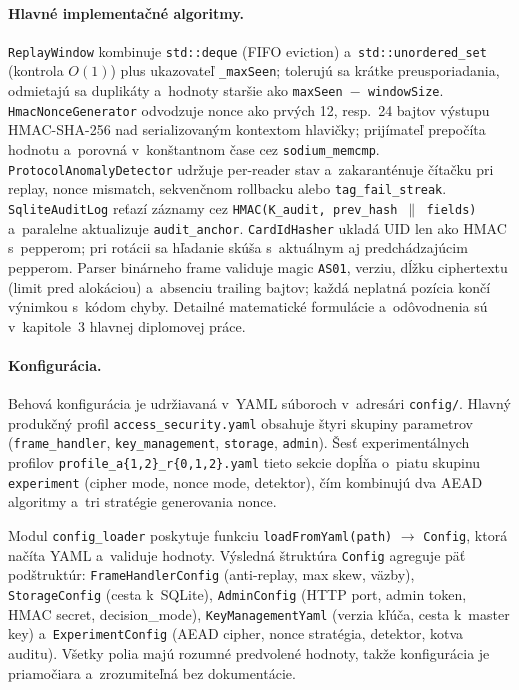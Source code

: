 \documentclass[a4paper]{feidipsp}
\begin{document}
\paragraph{Hlavné implementačné algoritmy.}
\texttt{ReplayWindow} kombinuje \texttt{std::deque} (FIFO eviction) a~\texttt{std::unordered\_set} (kontrola $O(1)$) plus ukazovateľ \texttt{\_maxSeen}; tolerujú sa krátke preusporiadania, odmietajú sa duplikáty a~hodnoty staršie ako \texttt{maxSeen $-$ windowSize}\cite{RFC5116}. \texttt{HmacNonceGenerator} odvodzuje nonce ako prvých 12, resp.\ 24 bajtov výstupu HMAC-SHA-256 nad serializovaným kontextom hlavičky\cite{RFC5869}; prijímateľ prepočíta hodnotu a~porovná v~konštantnom čase cez \texttt{sodium\_memcmp}\cite{LibsodiumDoc}. \texttt{ProtocolAnomalyDetector} udržuje per-reader stav a~zakaranténuje čítačku pri replay, nonce mismatch, sekvenčnom rollbacku alebo \texttt{tag\_fail\_streak}\cite{DefenseInDepth,NIST80094}. \texttt{SqliteAuditLog} reťazí záznamy cez \texttt{HMAC(K\_audit, prev\_hash $\|$ fields)} a~paralelne aktualizuje \texttt{audit\_anchor}\cite{SchneierKelsey1999}. \texttt{CardIdHasher} ukladá UID len ako HMAC s~pepperom; pri rotácii sa hľadanie skúša s~aktuálnym aj predchádzajúcim pepperom. Parser binárneho frame validuje magic \texttt{AS01}, verziu, dĺžku ciphertextu (limit pred alokáciou) a~absenciu trailing bajtov; každá neplatná pozícia končí výnimkou s~kódom chyby. Detailné matematické formulácie a~odôvodnenia sú v~kapitole~3 hlavnej diplomovej práce.

\paragraph{Konfigurácia.}

Behová konfigurácia je udržiavaná v~YAML súboroch v~adresári \texttt{config/}. Hlavný produkčný profil \texttt{access\_security.yaml} obsahuje štyri skupiny parametrov (\texttt{frame\_handler}, \texttt{key\_management}, \texttt{storage}, \texttt{admin}). Šesť experimentálnych profilov \texttt{profile\_a\{1,2\}\_r\{0,1,2\}.yaml} tieto sekcie dopĺňa o~piatu skupinu \texttt{experiment} (cipher mode, nonce mode, detektor), čím kombinujú dva AEAD algoritmy a~tri stratégie generovania nonce.

Modul \texttt{config\_loader} poskytuje funkciu \texttt{loadFromYaml(path)} $\rightarrow$ \texttt{Config}, ktorá načíta YAML a~validuje hodnoty. Výsledná štruktúra \texttt{Config} agreguje päť podštruktúr: \texttt{FrameHandlerConfig} (anti-replay, max skew, väzby), \texttt{StorageConfig} (cesta k~SQLite), \texttt{AdminConfig} (HTTP port, admin token, HMAC secret, decision\_mode), \texttt{KeyManagementYaml} (verzia kľúča, cesta k~master key) a~\texttt{ExperimentConfig} (AEAD cipher, nonce stratégia, detektor, kotva auditu). Všetky polia majú rozumné predvolené hodnoty, takže konfigurácia je priamočiara a~zrozumiteľná bez dokumentácie.
\end{document}
